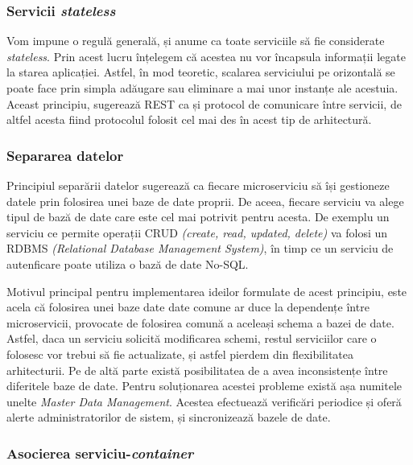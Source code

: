 \subsubsection{Servicii \textit{stateless}}

Vom impune o regulă generală, și anume ca toate serviciile să fie considerate \textit{stateless}. Prin acest lucru înțelegem că acestea nu vor încapsula informații legate la starea aplicației. Astfel, în mod teoretic, scalarea serviciului pe orizontală se poate face prin simpla adăugare sau eliminare a mai unor instanțe ale acestuia. Aceast principiu, sugerează REST ca și protocol de comunicare între servicii, de altfel acesta fiind protocolul folosit cel mai des în acest tip de arhitectură\cite{buildingmicro}. 

\subsubsection{Separarea datelor}

Principiul separării datelor sugerează ca fiecare microserviciu să își gestioneze datele prin folosirea unei baze de date proprii. De aceea, fiecare serviciu va alege tipul de bază de date care este cel mai potrivit pentru acesta. De exemplu un serviciu ce permite operații CRUD \textit{(create, read, updated, delete)} va folosi un RDBMS \textit{(Relational Database Management System)}, în timp ce un serviciu de autenficare poate utiliza o bază de date No-SQL. 

Motivul principal pentru implementarea ideilor formulate de acest principiu, este acela că folosirea unei baze date date comune ar duce la dependențe între microservicii, provocate de folosirea comună a aceleași schema a bazei de date. Astfel, daca un serviciu solicită modificarea schemi, restul serviciilor care o folosesc vor trebui să fie actualizate, și astfel pierdem din flexibilitatea arhitecturii. Pe de altă parte există posibilitatea de a avea inconsistențe între diferitele baze de date. Pentru soluționarea acestei probleme există așa numitele unelte \textit{Master Data Management}. Acestea efectuează verificări periodice și oferă alerte administratorilor de sistem, și sincronizează bazele de date.

\subsubsection{Asocierea serviciu-\textit{container}}

